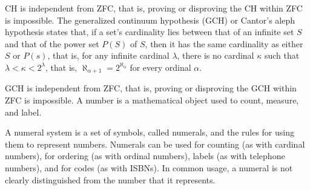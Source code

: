 \documentclass[a4paper,12pt]{report}
\begin{document}
CH is independent from ZFC, that is, proving or disproving the CH within ZFC is impossible.
The generalized continuum hypothesis (GCH) or Cantor's aleph hypothesis states that, if a set's cardinality lies between that of an infinite set $S$ and that of the power set $P(S)$ of $S$, then it has the same cardinality as either $S$ or $P(s)$, that is, for any infinite cardinal $\lambda$, there is no cardinal $\kappa$ such that $\lambda <\kappa <2^{\lambda }$, that is, $\aleph _{\alpha +1}=2^{\aleph _{\alpha }}$ for every ordinal $\alpha$.

GCH is independent from ZFC, that is, proving or disproving the GCH within ZFC is impossible.
A number is a mathematical object used to count, measure, and label.

A numeral system is a set of symbols, called numerals, and the rules for using them to represent numbers. Numerals can be used for counting (as with cardinal numbers), for ordering (as with ordinal numbers), labels (as with telephone numbers), and for codes (as with ISBNs). In common usage, a numeral is not clearly distinguished from the number that it represents.
\end{document}

